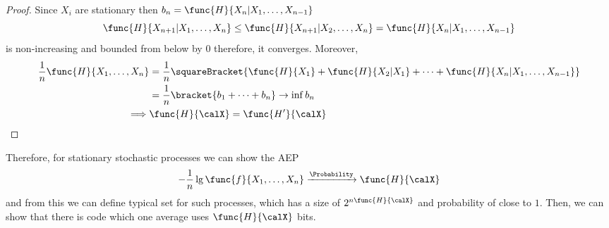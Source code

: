 \begin{proof}
    Since \(X_i\) are stationary then \(b_n = \func{H}{X_n | X_1 , \dots , X_{n-1}}\)
    \begin{equation*}
        \func{H}{X_{n + 1} | X_1 , \dots , X_n} \leq \func{H}{X_{n+1}| X_2 , \dots , X_n} = \func{H}{X_n | X_1 , \dots , X_{n-1}}
    \end{equation*}
    is non-increasing and bounded from below by \(0\) therefore, it converges. Moreover, 
    \begin{align*}
       \dfrac{1}{n} \func{H}{X_1, \dots,  X_n} &= \dfrac{1}{n} \squareBracket{\func{H}{X_1} + \func{H}{X_2 | X_1} + \dots + \func{H}{X_n | X_1, \dots, X_{n-1}}}\\
       &= \dfrac{1}{n} \bracket{b_1 + \dots  + b_n} \to \inf b_n \\
       \implies& \func{H}{\calX} = \func{H'}{\calX}
    \end{align*}

\end{proof}

Therefore, for stationary stochastic processes we can show the AEP 
\begin{equation*}
    -\dfrac{1}{n} \lg \func{f}{X_1, \dots , X_n} \xrightarrow{\Probability} \func{H}{\calX}
\end{equation*}
and from this we can define typical set for such processes, which has a size of \(2^{n \func{H}{\calX}}\) and probability of close to \(1\). Then, we can show that there is code which one average uses \(\func{H}{\calX}\) bits. 